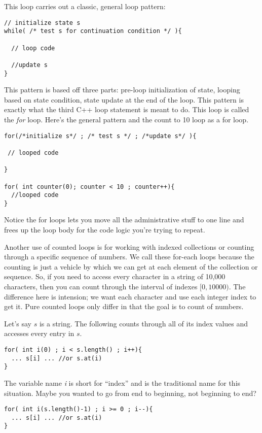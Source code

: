 \documentclass[]{tufte-handout}
\begin{document}
This loop carries out a classic, general loop pattern:
\begin{verbatim}
// initialize state s
while( /* test s for continuation condition */ ){
 
  // loop code
  
  //update s
}
\end{verbatim}
This pattern is based off three parts: pre-loop initialization of state, looping based on state condition, state update at the end of the loop.  This pattern is exactly what the third C++ loop statement is meant to do.  This loop is called the \textit{for} loop.  Here's the general pattern and the count to 10 loop as a for loop.
\begin{verbatim}
for(/*initialize s*/ ; /* test s */ ; /*update s*/ ){

 // looped code

}

for( int counter(0); counter < 10 ; counter++){
  //looped code
}
\end{verbatim} 
Notice the for loops lets you move all the administrative stuff to one line and frees up the loop body for the code logic you're trying to repeat. 

Another use of counted loops is for working with indexed collections or counting through a specific sequence of numbers.  We call these for-each loops because the counting is just a vehicle by which we can get at each element of the collection or sequence.  So, if you need to access every character in a string of 10,000 characters, then you can count through the interval of indexes $[0, 10000)$.  The difference here is intension; we want each character and use each integer index to get it.  Pure counted loops only differ in that the goal is to count of numbers. 

Let's say $s$ is a string. The following counts through all of its index values and accesses every entry in $s$.
\begin{verbatim}
for( int i(0) ; i < s.length() ; i++){
  ... s[i] ... //or s.at(i)
}
\end{verbatim}
The variable name \textit{i} is short for ``index'' and is the traditional name for this situation. Maybe you wanted to go from end to beginning, not beginning to end?
\begin{verbatim}
for( int i(s.length()-1) ; i >= 0 ; i--){
  ... s[i] ... //or s.at(i)
}
\end{verbatim}
\end{document}
